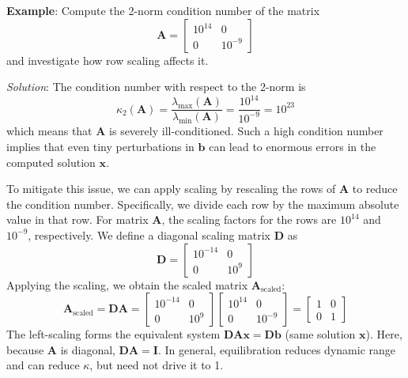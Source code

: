 \begin{exampleBox}
    \textbf{Example}: Compute the 2-norm condition number of the matrix
    \begin{equation*}
        \mathbf{A} = \begin{bmatrix}
        10^{14} & 0 \\
        0 & 10^{-9}
        \end{bmatrix}
    \end{equation*}
    and investigate how row scaling affects it.

    \emph{Solution}: The condition number with respect to the 2-norm is
    \begin{equation*}
        \kappa_2(\mathbf{A}) = \frac{\lambda_{\text{max}}(\mathbf{A})}{\lambda_{\text{min}}(\mathbf{A})} = \frac{10^{14}}{10^{-9}} = 10^{23}
    \end{equation*}
    which means that $\mathbf{A}$ is severely ill-conditioned. Such a high condition number implies that even tiny perturbations in $\mathbf{b}$ can lead to enormous errors in the computed solution $\mathbf{x}$.

    To mitigate this issue, we can apply scaling by rescaling the rows of $\mathbf{A}$ to reduce the condition number. Specifically, we divide each row by the maximum absolute value in that row. For matrix $\mathbf{A}$, the scaling factors for the rows are $10^{14}$ and $10^{-9}$, respectively. We define a diagonal scaling matrix $\mathbf{D}$ as
    \begin{equation*}
    \mathbf{D} = \begin{bmatrix}
    10^{-14} & 0 \\
    0 & 10^{9}
    \end{bmatrix}
    \end{equation*}
    Applying the scaling, we obtain the scaled matrix $\mathbf{A}_{\text{scaled}}$:
    \begin{equation*}
    \mathbf{A}_{\text{scaled}} = \mathbf{D} \mathbf{A} = \begin{bmatrix}
    10^{-14} & 0 \\
    0 & 10^{9}
    \end{bmatrix} \begin{bmatrix}
    10^{14} & 0 \\
    0 & 10^{-9}
    \end{bmatrix} = \begin{bmatrix}
    1 & 0 \\
    0 & 1
    \end{bmatrix}
    \end{equation*}
    The left-scaling forms the equivalent system $\mathbf{D}\mathbf{A}\mathbf{x} = \mathbf{D}\mathbf{b}$ (same solution $\mathbf{x}$). Here, because $\mathbf{A}$ is diagonal, $\mathbf{D}\mathbf{A} = \mathbf{I}$. In general, equilibration reduces dynamic range and can reduce $\kappa$, but need not drive it to 1.


\end{exampleBox}
